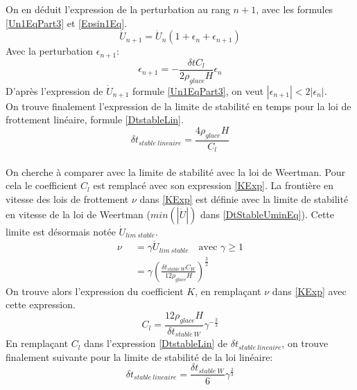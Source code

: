 \documentclass[11pt, a4paper]{article}
\begin{document}
On en déduit l'expression de la perturbation au rang $n+1$, avec les formules \ref{Un1EqPart3} et \ref{Epsin1Eq}.
\begin{equation}
	\dot{U}_{n+1} = \dot{U}_n (1+ \epsilon_n + \epsilon_{n+1})
	\label{Un1EqPart3}
\end{equation}
Avec la perturbation $\epsilon_{n+1}$:
\begin{equation}
	\label{Epsn1Eq}
	\epsilon_{n+1} = - \frac{\delta t C_l }{2 \rho_{glace} H } \epsilon_n 
\end{equation}
D'après l'expression de $\dot{U}_{n+1}$ formule \ref{Un1EqPart3}, on veut $ |\epsilon_{n+1} | < 2 | \epsilon_n |$.
\\ On trouve finalement l'expression de la limite de stabilité en temps pour la loi de frottement linéaire, formule \ref{DtstableLin}.
\begin{equation}
	\delta t_{stable \ lineaire} = \frac{4 \rho_{glace} H }{C_l}
	\label{DtstableLin}
\end{equation}
\\

On cherche à comparer avec la limite de stabilité avec la loi de Weertman. Pour cela le coefficient $C_l$ est remplacé avec son expression \ref{KExp}. La frontière en vitesse des lois de frottement $\nu$ dans \ref{KExp} est définie avec la limite de stabilité en vitesse de la loi de Weertman ($min ( | \dot{U} | ) $ dans \ref{DtStableUminEq}). Cette limite est désormais notée $\dot{U}_{lim \ stable}$. 
\begin{align*}
	\nu &= \gamma \dot{U}_{lim \ stable} \quad \text{avec } \gamma \geq 1 \\
	\quad &= \gamma \left( \frac{\delta t_{stable \ W} C_W }{12 \rho_{glace} H} \right)^{\frac{3}{2}}
\end{align*}
On trouve alors l'expression du coefficient $K$, en remplaçant $\nu$ dans \ref{KExp} avec cette expression. 
\begin{equation}
	C_l = \frac{12 \rho_{glace} H }{\delta t_{stable \ W}} \gamma^{- \frac{2}{3}}
	\label{KExp2}
\end{equation}
En remplaçant $C_l$ dans l'expression \ref{DtstableLin} de $\delta t_{stable \ lineaire}$, on trouve finalement suivante pour la limite de stabilité de la loi linéaire:
\begin{equation}
	\delta t_{stable \ lineaire} = \frac{\delta t_{stable \ W} }{6} \gamma^{\frac{2}{3}}
	\label{DtStLin2}
\end{equation}
\\
\end{document}
